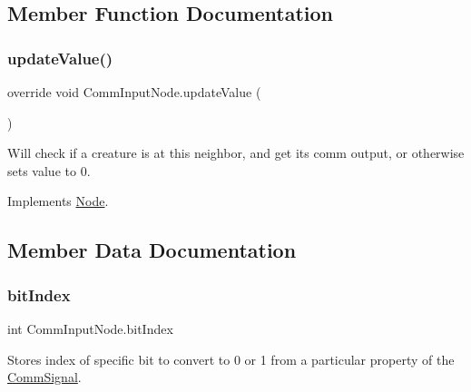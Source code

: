 \subsection{Member Function Documentation}
\mbox{\label{class_comm_input_node_a22f5ea13329e77f47db18d28336cc52e}} 
\subsubsection{\texorpdfstring{update\+Value()}{updateValue()}}
{\footnotesize\ttfamily override void Comm\+Input\+Node.\+update\+Value (\begin{DoxyParamCaption}{ }\end{DoxyParamCaption})\hspace{0.3cm}{\ttfamily [virtual]}}



Will check if a creature is at this neighbor, and get it\textquotesingle{}s comm output, or otherwise sets value to 0. 



Implements \mbox{\hyperlink{class_node_a85ebd0e36c25430570b94f923afd2a62}{Node}}.



\subsection{Member Data Documentation}
\mbox{\label{class_comm_input_node_a37287af65740dffcdb3c36630264ded8}} 
\subsubsection{\texorpdfstring{bit\+Index}{bitIndex}}
{\footnotesize\ttfamily int Comm\+Input\+Node.\+bit\+Index}



Stores index of specific bit to convert to 0 or 1 from a particular property of the \mbox{\hyperlink{class_comm_signal}{Comm\+Signal}}. 

\mbox{\label{class_comm_input_node_a1a81a36b88a72dacb21af46740a3bfda}} 
